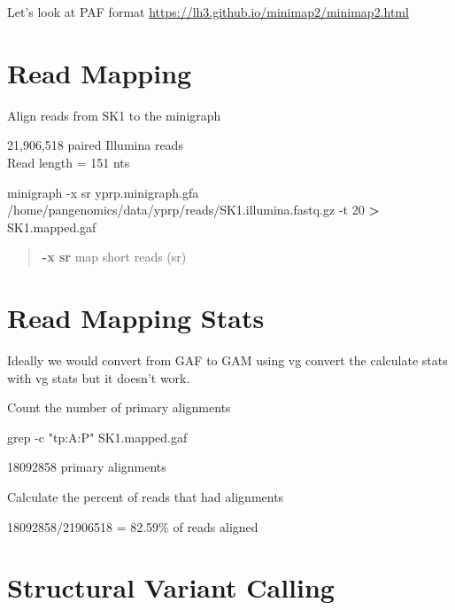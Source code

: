 \documentclass[
]{book}
\newenvironment{Shaded}{\begin{snugshade}}{\end{snugshade}}
\newcommand{\AttributeTok}[1]{\textcolor[rgb]{0.77,0.63,0.00}{#1}}
\newcommand{\ExtensionTok}[1]{#1}
\newcommand{\FunctionTok}[1]{\textcolor[rgb]{0.00,0.00,0.00}{#1}}
\newcommand{\NormalTok}[1]{#1}
\newcommand{\OperatorTok}[1]{\textcolor[rgb]{0.81,0.36,0.00}{\textbf{#1}}}
\newcommand{\StringTok}[1]{\textcolor[rgb]{0.31,0.60,0.02}{#1}}
\begin{document}
Let's look at PAF format
\url{https://lh3.github.io/minimap2/minimap2.html}

\hypertarget{read-mapping-1}{%
\section{Read Mapping}\label{read-mapping-1}}

Align reads from SK1 to the minigraph

21,906,518 paired Illumina reads\\
Read length = 151 nts

\begin{Shaded}
\begin{Highlighting}[]
\ExtensionTok{minigraph} \AttributeTok{{-}x}\NormalTok{ sr yprp.minigraph.gfa /home/pangenomics/data/yprp/reads/SK1.illumina.fastq.gz }\AttributeTok{{-}t}\NormalTok{ 20 }\OperatorTok{\textgreater{}}\NormalTok{ SK1.mapped.gaf}
\end{Highlighting}
\end{Shaded}

\begin{quote}
\textbf{-x sr} map short reads (sr)
\end{quote}

\hypertarget{read-mapping-stats}{%
\section{Read Mapping Stats}\label{read-mapping-stats}}

Ideally we would convert from GAF to GAM using vg convert the calculate stats with vg stats but it doesn't work.

Count the number of primary alignments

\begin{Shaded}
\begin{Highlighting}[]
\FunctionTok{grep} \AttributeTok{{-}c} \StringTok{"tp:A:P"}\NormalTok{ SK1.mapped.gaf}
\end{Highlighting}
\end{Shaded}

18092858 primary alignments

Calculate the percent of reads that had alignments

18092858/21906518 = 82.59\% of reads aligned

\hypertarget{structural-variant-calling}{%
\section{Structural Variant Calling}\label{structural-variant-calling}}
\end{document}
